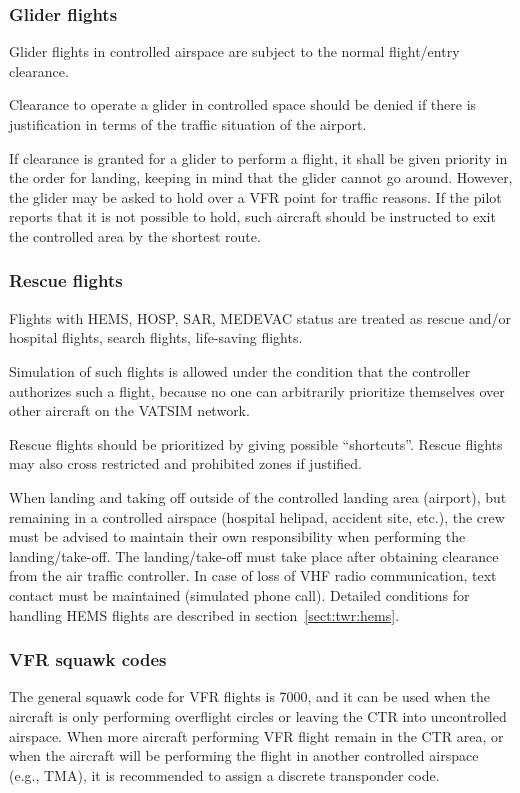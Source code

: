 \subsubsection{Glider flights}
Glider flights in controlled airspace are subject to the normal flight/entry clearance.

Clearance to operate a glider in controlled space should be denied if there is justification in terms of the traffic situation of the airport.

If clearance is granted for a glider to perform a flight, it shall be given priority in the order for landing, keeping in mind that the glider cannot go around. However, the glider may be asked to hold over a VFR point for traffic reasons. If the pilot reports that it is not possible to hold, such aircraft should be instructed to exit the controlled area by the shortest route.

\subsubsection{Rescue flights}

Flights with HEMS, HOSP, SAR, MEDEVAC status are treated as rescue and/or hospital flights, search flights, life-saving flights.

Simulation of such flights is allowed under the condition that the controller authorizes such a flight, because no one can arbitrarily prioritize themselves over other aircraft on the VATSIM network.

Rescue flights should be prioritized by giving possible ``shortcuts''. Rescue flights may also cross restricted and prohibited zones if justified.

When landing and taking off outside of the controlled landing area (airport), but remaining in a controlled airspace (hospital helipad, accident site, etc.), the crew must be advised to maintain their own responsibility when performing the landing/take-off. The landing/take-off must take place after obtaining clearance from the air traffic controller. 
In case of loss of VHF radio communication, text contact must be maintained (simulated phone call).
Detailed conditions for handling HEMS flights are described in section~\ref{sect:twr:hems}.

\subsubsection{VFR squawk codes}
The general squawk code for VFR flights is 7000, and it can be used when the aircraft is only performing overflight circles or leaving the CTR into uncontrolled airspace. When more aircraft performing VFR flight remain in the CTR area, or when the aircraft will be performing the flight in another controlled airspace (e.g., TMA), it is recommended to assign a discrete transponder code.

